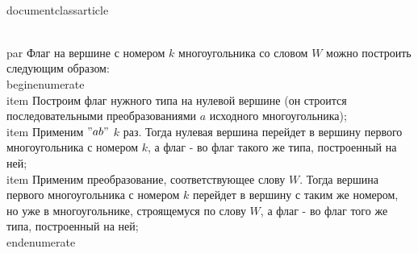 \\documentclass{article}
\begin{document}
\\par Флаг на вершине с номером $k$ многоугольника со словом $W$ можно построить следующим образом:
\\begin{enumerate}
    \\item Построим флаг нужного типа на нулевой вершине (он строится последовательными преобразованиями $a$ исходного многоугольника);
    \\item Применим $"ab"$ $k$ раз. Тогда нулевая вершина перейдет в вершину первого многоугольника с номером $k$, а флаг - во флаг такого же типа, построенный на ней;
    \\item Применим преобразование, соответствующее слову $W$. Тогда вершина первого многоугольника с номером $k$ перейдет в вершину с таким же номером, но уже в многоугольнике, строящемуся по слову $W$, а флаг - во флаг того же типа, построенный на ней;
\\end{enumerate}
\end{document}
